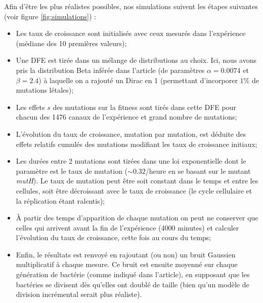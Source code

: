 \documentclass[12pt]{article}
\begin{document}
Afin d'être les plus réalistes possibles, nos simulations suivent les étapes suivantes (voir figure \ref{fig:simulations}) :
\begin{itemize}
\item Les taux de croissance sont initialisés avec ceux mesurés dans l'expérience (médiane des 10 premières valeurs);
\item Une DFE est tirée dans un mélange de distributions au choix. Ici, nous avons pris la distribution Beta inférée dans l'article (de paramètres $\alpha=0.0074$ et $\beta=2.4$) à laquelle on a rajouté un Dirac en 1 (permettant d'incorporer $1\%$ de mutations létales);
\item Les effets $s$ des mutations sur la fitness sont tirés dans cette DFE pour chacun des 1476 canaux de l'expérience et grand nombre de mutations;
\item L'évolution du taux de croissance, mutation par mutation, est déduite des effets relatifs cumulés des mutations modifiant les taux de croissance initiaux;
\item Les durées entre 2 mutations sont tirées dans une loi exponentielle dont le paramètre est le taux de mutation ($\sim0.32$/heure en se basant sur le mutant \emph{mutH}). Le taux de mutation peut être soit constant dans le temps et entre les cellules, soit être décroissant avec le taux de croissance (le cycle cellulaire et la réplication étant ralentis);
\item À partir des temps d'apparition de chaque mutation on peut ne conserver que celles qui arrivent avant la fin de l'expérience (4000 minutes) et calculer l'évolution du taux de croissance, cette fois au cours du temps;
\item Enfin, le résultats est renvoyé en rajoutant (ou non) un bruit Gaussien multiplicatif à chaque mesure. Ce bruit est ensuite moyenné sur chaque génération de bactérie (comme indiqué dans l'article), en supposant que les bactéries se divisent dès qu'elles ont doublé de taille (bien qu'un modèle de division incrémental serait plus réaliste).
\end{itemize}
\end{document}
